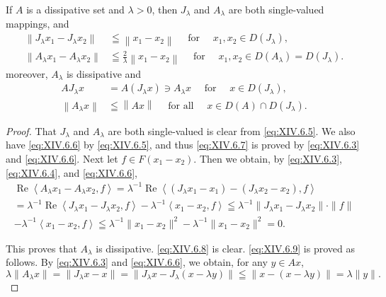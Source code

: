 \begin{proposition}\label{prop:XIV.6.Proposition.1} If $A$ is a dissipative set and $\lambda > 0$, then $J_{\lambda}$ and $A_{\lambda}$ are both single-valued mappings, and 
\begin{align}
\left\| J _{\lambda} x _{1} - J _{\lambda} x _{2} \right\|& \leqq \left\| x _{1} - x _{2} \right\| \quad \text{ for } \quad x _{1}, x _{2} \in D (J _{\lambda}), \label{eq:XIV.6.6} \\
\left\| A _{\lambda} x _{1} - A _{\lambda} x _{2} \right\|& \leqq \frac {2}{\lambda} \left\| x _{1} - x _{2} \right\| \quad \text{ for } \quad x _{1}, x _{2} \in D (A _{\lambda}) = D (J _{\lambda}). \label{eq:XIV.6.7}
\end{align}
moreover, $A_{\lambda}$ is dissipative and 
\begin{align}
A J _{\lambda} x& = A (J _{\lambda} x) \ni A _{\lambda} x \quad \text{ for } \quad x \in D (J _{\lambda}), \label{eq:XIV.6.8} \\
\left\| A _{\lambda} x \right\|& \leqq \left\| A x \right\| \quad \text{ for all } \quad x \in D (A) \cap D (J _{\lambda}). \label{eq:XIV.6.9}
\end{align}
\end{proposition}

\begin{proof}
 That $J_{\lambda}$ and $A_{\lambda}$ are both single-valued is clear from \eqref{eq:XIV.6.5}. We also have \eqref{eq:XIV.6.6} by \eqref{eq:XIV.6.5}, and thus \eqref{eq:XIV.6.7} is proved by \eqref{eq:XIV.6.3} and \eqref{eq:XIV.6.6}. Next let $f \in F(x_1 - x_2)$. Then we obtain, by \eqref{eq:XIV.6.3}, \eqref{eq:XIV.6.4}, and \eqref{eq:XIV.6.6}, 
\[
\begin{gathered}
\operatorname{Re} \left\langle A _{\lambda} x _{1} - A _{\lambda} x _{2}, f \right\rangle = \lambda^{-1} \operatorname{Re} \left\langle (J _{\lambda} x _{1} - x _{1}) - (J _{\lambda} x _{2} - x _{2}), f \right\rangle
\\
= \lambda^{-1} \operatorname{Re} \left\langle J _{\lambda} x _{1} - J _{\lambda} x _{2}, f \right\rangle - \lambda^{-1} \left\langle x _{1} - x _{2}, f \right\rangle \leqq \lambda^{-1} \| J _{\lambda} x _{1} - J _{\lambda} x _{2} \| \cdot \| f \|
\\
- \lambda^{-1} \left\langle x _{1} - x _{2}, f \right\rangle \leqq \lambda^{-1} \| x _{1} - x _{2} \| ^{2} - \lambda^{-1} \| x _{1} - x _{2} \| ^{2} = 0. \end{gathered}
\]

This proves that $A_{\lambda}$ is dissipative. \eqref{eq:XIV.6.8} is clear. \eqref{eq:XIV.6.9} is proved as follows. By \eqref{eq:XIV.6.3} and \eqref{eq:XIV.6.6}, we obtain, for any $y \in Ax$, 
\[
\lambda \| A _{\lambda} x \| = \| J _{\lambda} x - x \| = \| J _{\lambda} x - J _{\lambda} (x - \lambda y) \| \leqq \| x - (x - \lambda y) \| = \lambda \| y \|.
\]
\end{proof}

